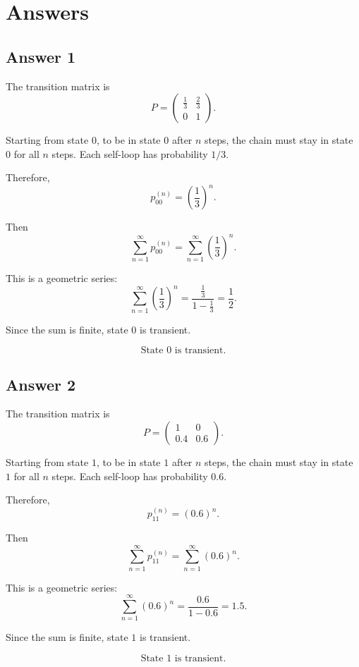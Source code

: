 \documentclass[12pt,a4paper]{article}
\theoremstyle{notestyle}
\begin{document}
\section{Answers}

\subsection*{Answer 1}

The transition matrix is
\[
P=
\begin{pmatrix}
\frac13 & \frac23\\
0 & 1
\end{pmatrix}.
\]

Starting from state $0$, to be in state $0$ after $n$ steps, the chain must stay in state $0$ for all $n$ steps. Each self-loop has probability $1/3$.

Therefore,
\[
p_{00}^{(n)}=\left(\frac13\right)^n.
\]

Then
\[
\sum_{n=1}^{\infty}p_{00}^{(n)}
=
\sum_{n=1}^{\infty}\left(\frac13\right)^n.
\]

This is a geometric series:
\[
\sum_{n=1}^{\infty}\left(\frac13\right)^n
=
\frac{\frac13}{1-\frac13}
=
\frac12.
\]

Since the sum is finite, state $0$ is transient.

\[
\boxed{\text{State }0\text{ is transient.}}
\]

\subsection*{Answer 2}

The transition matrix is
\[
P=
\begin{pmatrix}
1 & 0\\
0.4 & 0.6
\end{pmatrix}.
\]

Starting from state $1$, to be in state $1$ after $n$ steps, the chain must stay in state $1$ for all $n$ steps. Each self-loop has probability $0.6$.

Therefore,
\[
p_{11}^{(n)}=(0.6)^n.
\]

Then
\[
\sum_{n=1}^{\infty}p_{11}^{(n)}
=
\sum_{n=1}^{\infty}(0.6)^n.
\]

This is a geometric series:
\[
\sum_{n=1}^{\infty}(0.6)^n
=
\frac{0.6}{1-0.6}
=
1.5.
\]

Since the sum is finite, state $1$ is transient.

\[
\boxed{\text{State }1\text{ is transient.}}
\]
\end{document}
